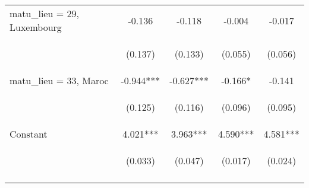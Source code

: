 \begin{center}
\begin{tabular}{lcccc}
matu\_lieu = 29, Luxembourg & -0.136 & -0.118 & -0.004 & -0.017 \\
\vspace{4pt} & \begin{footnotesize}(0.137)\end{footnotesize} & \begin{footnotesize}(0.133)\end{footnotesize} & \begin{footnotesize}(0.055)\end{footnotesize} & \begin{footnotesize}(0.056)\end{footnotesize} \\
matu\_lieu = 33, Maroc & -0.944*** & -0.627*** & -0.166* & -0.141 \\
\vspace{4pt} & \begin{footnotesize}(0.125)\end{footnotesize} & \begin{footnotesize}(0.116)\end{footnotesize} & \begin{footnotesize}(0.096)\end{footnotesize} & \begin{footnotesize}(0.095)\end{footnotesize} \\
Constant & 4.021*** & 3.963*** & 4.590*** & 4.581*** \\
 & \begin{footnotesize}(0.033)\end{footnotesize} & \begin{footnotesize}(0.047)\end{footnotesize} & \begin{footnotesize}(0.017)\end{footnotesize} & \begin{footnotesize}(0.024)\end{footnotesize} \\
\vspace{4pt} & \begin{footnotesize}\end{footnotesize} & \begin{footnotesize}\end{footnotesize} & \begin{footnotesize}\end{footnotesize} & \begin{footnotesize}\end{footnotesize} \\

\end{tabular}
\end{center}
